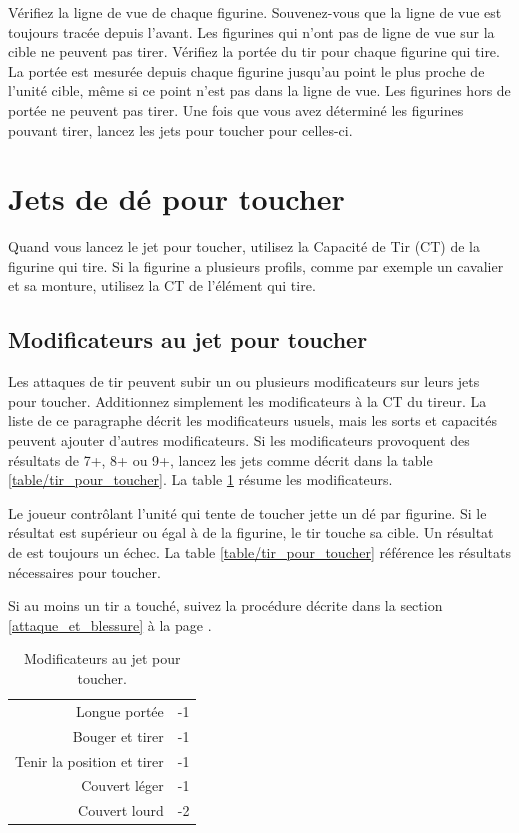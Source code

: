 Vérifiez la ligne de vue de chaque figurine. Souvenez-vous que la ligne de vue est toujours tracée depuis l'avant. Les figurines qui n'ont pas de ligne de vue sur la cible ne peuvent pas tirer. Vérifiez la portée du tir pour chaque figurine qui tire. La portée est mesurée depuis chaque figurine jusqu'au point le plus proche de l'unité cible, même si ce point n'est pas dans la ligne de vue. Les figurines hors de portée ne peuvent pas tirer. Une fois que vous avez déterminé les figurines pouvant tirer, lancez les jets pour toucher pour celles-ci.

\section{Jets de dé pour toucher}

Quand vous lancez le jet pour toucher, utilisez la Capacité de Tir (CT) de la figurine qui tire. Si la figurine a plusieurs profils, comme par exemple un cavalier et sa monture, utilisez la CT de l'élément qui tire. 

\subsection{Modificateurs au jet pour toucher}
\label{tir/modificateurs}

Les attaques de tir peuvent subir un ou plusieurs modificateurs sur leurs jets pour toucher. Additionnez simplement les modificateurs à la CT du tireur. La liste de ce paragraphe décrit les modificateurs usuels, mais les sorts et capacités peuvent ajouter d'autres modificateurs. Si les modificateurs provoquent des résultats de 7+, 8+ ou 9+, lancez les jets comme décrit dans la table \ref{table/tir_pour_toucher}. La table \ref{table/modificateur_tir} résume les modificateurs.

Le joueur contrôlant l'unité qui tente de toucher jette un dé par figurine. Si le résultat est supérieur ou égal à  de la figurine, le tir touche sa cible. Un résultat de  est toujours un échec. La table \ref{table/tir_pour_toucher} référence les résultats nécessaires pour toucher.

Si au moins un tir a touché, suivez la procédure décrite dans la section \ref{attaque_et_blessure} à la page \pageref{attaque_et_blessure}.

\renewcommand{\arraystretch}{1.2}
\begin{table}[!htbp]
\centering
\begin{tabular}{r|c}
Longue portée & -1 \\
Bouger et tirer & -1 \\
Tenir la position et tirer & -1 \\
Couvert léger & -1 \\
Couvert lourd & -2 \\
\end{tabular}
\caption{\label{table/modificateur_tir}Modificateurs au jet pour toucher.}
\end{table}
\renewcommand{\arraystretch}{1.5}


